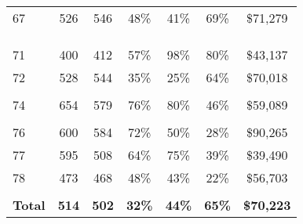 \documentclass[
  12pt,
]{article}
\begin{document}
\begin{table}
{\begin{tabular}{>{}l>{}c>{}c>{}c>{}c>{}c>{}c}
67 & 526 & 546 & 48\% & 41\% & 69\% & \$71,279\\
\cellcolor[HTML]{b9efe6}{68} & \cellcolor[HTML]{b9efe6}{541} & \cellcolor[HTML]{b9efe6}{540} & \cellcolor[HTML]{b9efe6}{41\%} & \cellcolor[HTML]{b9efe6}{26\%} & \cellcolor[HTML]{b9efe6}{62\%} & \cellcolor[HTML]{b9efe6}{\$79,260}\\
\cellcolor[HTML]{b9efe6}{69} & \cellcolor[HTML]{b9efe6}{390} & \cellcolor[HTML]{b9efe6}{395} & \cellcolor[HTML]{b9efe6}{36\%} & \cellcolor[HTML]{b9efe6}{92\%} & \cellcolor[HTML]{b9efe6}{74\%} & \cellcolor[HTML]{b9efe6}{\$43,391}\\
\cellcolor[HTML]{b9efe6}{70} & \cellcolor[HTML]{b9efe6}{595} & \cellcolor[HTML]{b9efe6}{581} & \cellcolor[HTML]{b9efe6}{56\%} & \cellcolor[HTML]{b9efe6}{33\%} & \cellcolor[HTML]{b9efe6}{48\%} & \cellcolor[HTML]{b9efe6}{\$105,721}\\
71 & 400 & 412 & 57\% & 98\% & 80\% & \$43,137\\
72 & 528 & 544 & 35\% & 25\% & 64\% & \$70,018\\
\cellcolor[HTML]{b9efe6}{73} & \cellcolor[HTML]{b9efe6}{451} & \cellcolor[HTML]{b9efe6}{438} & \cellcolor[HTML]{b9efe6}{24\%} & \cellcolor[HTML]{b9efe6}{89\%} & \cellcolor[HTML]{b9efe6}{76\%} & \cellcolor[HTML]{b9efe6}{\$48,406}\\
74 & 654 & 579 & 76\% & 80\% & 46\% & \$59,089\\
\cellcolor[HTML]{b9efe6}{75} & \cellcolor[HTML]{b9efe6}{514} & \cellcolor[HTML]{b9efe6}{502} & \cellcolor[HTML]{b9efe6}{31\%} & \cellcolor[HTML]{b9efe6}{20\%} & \cellcolor[HTML]{b9efe6}{71\%} & \cellcolor[HTML]{b9efe6}{\$72,850}\\
76 & 600 & 584 & 72\% & 50\% & 28\% & \$90,265\\
77 & 595 & 508 & 64\% & 75\% & 39\% & \$39,490\\
78 & 473 & 468 & 48\% & 43\% & 22\% & \$56,703\\
\cellcolor[HTML]{b9efe6}{79} & \cellcolor[HTML]{b9efe6}{594} & \cellcolor[HTML]{b9efe6}{585} & \cellcolor[HTML]{b9efe6}{61\%} & \cellcolor[HTML]{b9efe6}{26\%} & \cellcolor[HTML]{b9efe6}{71\%} & \cellcolor[HTML]{b9efe6}{\$65,180}\\
\addlinespace
\textbf{Total} & \textbf{514} & \textbf{502} & \textbf{32\%} & \textbf{44\%} & \textbf{65\%} & \textbf{\$70,223}\\
\bottomrule
\end{tabular}}
\end{table}
\begingroup
\fontsize{10}{10}\selectfont
\end{document}
